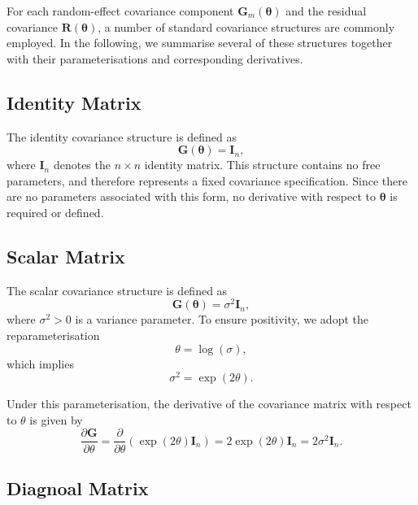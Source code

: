 \documentclass[
  letterpaper,
  DIV=11,
  numbers=noendperiod]{scrartcl}
\begin{document}
For each random-effect covariance component
\(\symbf{G}_m(\symbf{\theta})\) and the residual covariance
\(\symbf{R}(\symbf{\theta})\), a number of standard covariance
structures are commonly employed. In the following, we summarise several
of these structures together with their parameterisations and
corresponding derivatives.

\subsection{Identity Matrix}\label{identity-matrix}

The identity covariance structure is defined as \begin{equation}
\symbf{G}(\symbf{\theta}) = \symbf{I}_n,
\end{equation} where \(\symbf{I}_n\) denotes the \(n \times n\) identity
matrix. This structure contains no free parameters, and therefore
represents a fixed covariance specification. Since there are no
parameters associated with this form, no derivative with respect to
\(\symbf{\theta}\) is required or defined.

\subsection{Scalar Matrix}\label{scalar-matrix}

The scalar covariance structure is defined as \begin{equation}
\symbf{G}(\symbf{\theta}) = \sigma^2 \symbf{I}_n,
\end{equation} where \(\sigma^2 > 0\) is a variance parameter. To ensure
positivity, we adopt the reparameterisation \begin{equation}
\theta = \log(\sigma),
\end{equation} which implies \begin{equation}
\sigma^2 = \exp(2\theta).
\end{equation}

Under this parameterisation, the derivative of the covariance matrix
with respect to \(\theta\) is given by \begin{equation}
\frac{\partial \symbf{G}}{\partial \theta}
= \frac{\partial}{\partial \theta}\left(\exp(2\theta)\symbf{I}_n\right)
= 2\exp(2\theta)\symbf{I}_n
= 2\sigma^2 \symbf{I}_n.
\end{equation}

\subsection{Diagnoal Matrix}\label{diagnoal-matrix}
\end{document}
